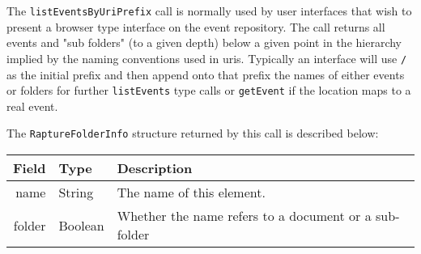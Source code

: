 The \verb+listEventsByUriPrefix+ call is normally used by user interfaces that wish
to present a browser type interface on the event repository. The call returns all events
and "sub folders" (to a given depth) below a given point in the hierarchy implied
by the naming conventions used in uris. Typically an interface will use \verb+/+ as
the initial prefix and then append onto that prefix the names of either events
or folders for further \verb+listEvents+ type calls or \verb+getEvent+ if the location
maps to a real event.

The \verb+RaptureFolderInfo+ structure returned by this call is described below:

\begin{table}[ht]
  \small
\begin{center}
\begin{tabular}{r l p{8cm}}
  Field & Type & Description \\
  \hline
  name & String & The name of this element. \\
  folder & Boolean & Whether the name refers to a document or a sub-folder \\
\end{tabular}
\end{center}
\end{table}

